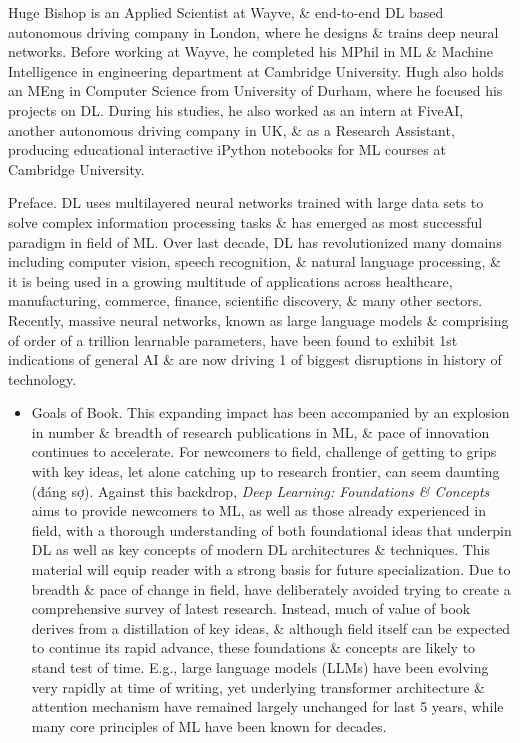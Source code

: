 \documentclass{article}
\begin{document}
\begin{enumerate}
\begin{itemize}
		{\sc Huge Bishop} is an Applied Scientist at Wayve, \& end-to-end DL based autonomous driving company in London, where he designs \& trains deep neural networks. Before working at Wayve, he completed his MPhil in ML \& Machine Intelligence in engineering department at Cambridge University. {\sc Hugh} also holds an MEng in Computer Science from University of Durham, where he focused his projects on DL. During his studies, he also worked as an intern at FiveAI, another autonomous driving company in UK, \& as a Research Assistant, producing educational interactive iPython notebooks for ML courses at Cambridge University.
	\end{itemize}
	{\sf Preface.} DL uses multilayered neural networks trained with large data sets to solve complex information processing tasks \& has emerged as most successful paradigm in field of ML. Over last decade, DL has revolutionized many domains including computer vision, speech recognition, \& natural language processing, \& it is being used in a growing multitude of applications across healthcare, manufacturing, commerce, finance, scientific discovery, \& many other sectors. Recently, massive neural networks, known as large language models \& comprising of order of a trillion learnable parameters, have been found to exhibit 1st indications of general AI \& are now driving 1 of biggest disruptions in history of technology.
	\begin{itemize}
		\item {\sf Goals of Book.} This expanding impact has been accompanied by an explosion in number \& breadth of research publications in ML, \& pace of innovation continues to accelerate. For newcomers to field, challenge of getting to grips with key ideas, let alone catching up to research frontier, can seem daunting (đáng sợ). Against this backdrop, {\it Deep Learning: Foundations \& Concepts} aims to provide newcomers to ML, as well as those already experienced in field, with a thorough understanding of both foundational ideas that underpin DL as well as key concepts of modern DL architectures \& techniques. This material will equip reader with a strong basis for future specialization. Due to breadth \& pace of change in field, have deliberately avoided trying to create a comprehensive survey of latest research. Instead, much of value of book derives from a distillation of key ideas, \& although field itself can be expected to continue its rapid advance, these foundations \& concepts are likely to stand test of time. E.g., large language models (LLMs) have been evolving very rapidly at time of writing, yet underlying transformer architecture \& attention mechanism have remained largely unchanged for last 5 years, while many core principles of ML have been known for decades.

\end{itemize}
\end{enumerate}
\end{document}
